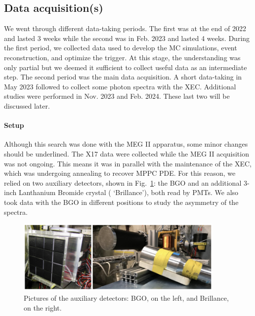 \begin{refsection}
    \subsection{Data acquisition(s)}
    \label{sec:X17:beamtuning}
        We went through different data-taking periods. 
        The first was at the end of 2022 and lasted 3 weeks while the second was in Feb. 2023 and lasted 4 weeks.
        During the first period, we collected data used to develop the MC simulations, event reconstruction, and optimize the trigger.
        At this stage, the understanding was only partial but we deemed it sufficient to collect useful data as an intermediate step.
        The second period was the main data acquisition. 
        A short data-taking in May 2023 followed to collect some photon spectra with the XEC.
        Additional studies were performed in Nov. 2023 and Feb. 2024.
        These last two will be discussed later.

        \paragraph{Setup} Although this search was done with the MEG II apparatus, some minor changes should be underlined.
        The X17 data were collected while the MEG II acquisition was not ongoing. This means it was in parallel with the maintenance of the XEC, which was undergoing annealing to recover MPPC PDE.
        For this reason, we relied on two auxiliary detectors, shown in Fig.~\ref{fig:X17:Brillance}: the BGO and an additional 3-inch Lanthanium Bromide crystal ( `Brillance'), both read by PMTs.
        We also took data with the BGO in different positions to study the asymmetry of the spectra.

        \begin{figure}
            \centering
            \includegraphics[width = 0.9\textwidth]{Figures/X17/BGOandBrillance.png}
            \caption[X17: Auxiliarly detecotrs]{Pictures of the auxiliary detectors: BGO, on the left, and Brillance, on the right.}
            \label{fig:X17:Brillance}
        \end{figure}
        

\end{refsection}
